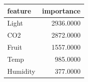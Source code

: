 \begin{tabular}{lr}
\toprule
feature & importance \\
\midrule
Light & 2936.0000 \\
CO2 & 2872.0000 \\
Fruit & 1557.0000 \\
Temp & 985.0000 \\
Humidity & 377.0000 \\
\bottomrule
\end{tabular}
